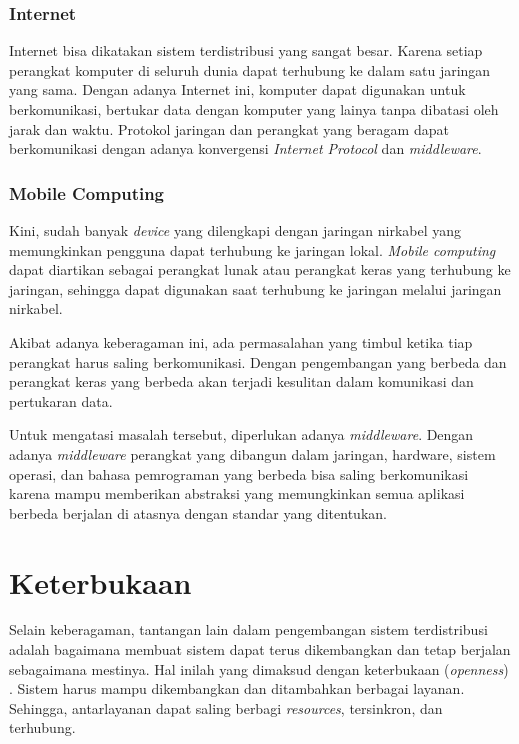 \documentclass[12pt,a4paper]{apa}
\begin{document}
	\subsubsection{\textbf{Internet}}
		
		Internet bisa dikatakan sistem terdistribusi yang sangat besar. Karena setiap perangkat komputer di seluruh dunia dapat terhubung ke dalam satu jaringan yang sama. Dengan adanya Internet ini, komputer dapat digunakan untuk berkomunikasi, bertukar data dengan komputer yang lainya tanpa dibatasi oleh jarak dan waktu. Protokol jaringan dan perangkat yang beragam dapat berkomunikasi dengan adanya konvergensi \emph{Internet Protocol} dan \emph{middleware}.
		
	\subsubsection{\textbf{Mobile Computing}}
		
		Kini, sudah banyak \emph{device} yang dilengkapi dengan jaringan nirkabel yang memungkinkan pengguna dapat terhubung ke jaringan lokal. \emph{Mobile computing} dapat diartikan sebagai perangkat lunak atau perangkat keras yang terhubung ke jaringan, sehingga dapat digunakan saat terhubung ke jaringan melalui jaringan nirkabel.
		
		Akibat adanya keberagaman ini, ada permasalahan yang timbul ketika tiap perangkat harus saling berkomunikasi. Dengan pengembangan yang berbeda dan perangkat keras yang berbeda akan terjadi kesulitan dalam komunikasi dan pertukaran data.
		
		Untuk mengatasi masalah tersebut, diperlukan adanya \emph{middleware}. Dengan adanya \emph{middleware} perangkat yang dibangun dalam jaringan, hardware, sistem operasi, dan bahasa pemrograman yang berbeda bisa saling berkomunikasi karena mampu memberikan abstraksi yang memungkinkan semua aplikasi berbeda berjalan di atasnya dengan standar yang ditentukan. \cite{Coulouris2012}
	\section{\textbf{Keterbukaan}}
	Selain keberagaman, tantangan lain dalam pengembangan sistem terdistribusi adalah bagaimana membuat sistem dapat terus dikembangkan dan tetap berjalan sebagaimana mestinya. Hal inilah yang dimaksud dengan keterbukaan (\emph{openness}) \cite{Coulouris2012}. Sistem harus mampu dikembangkan dan ditambahkan berbagai layanan. Sehingga, antarlayanan dapat saling berbagi \emph{resources}, tersinkron, dan terhubung. \cite{Coulouris2012}
	
\end{document}
